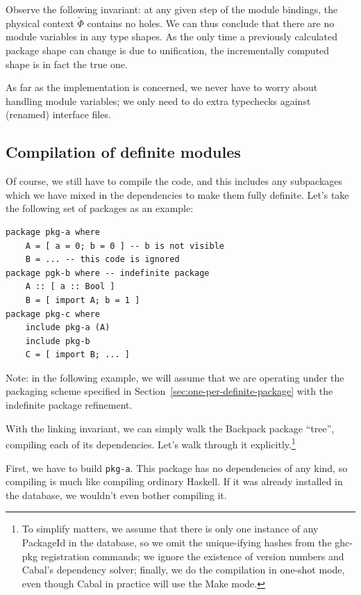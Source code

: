 \documentclass{article}
\begin{document}
Observe the following invariant: at any given step of the module
bindings, the physical context $\widetilde{\Phi}$ contains no
holes.  We can thus conclude that there are no module variables in any
type shapes.  As the only time a previously calculated package shape can
change is due to unification, the incrementally computed shape is in
fact the true one.

As far as the implementation is concerned, we never have to worry
about handling module variables; we only need to do extra typechecks
against (renamed) interface files.

\subsection{Compilation of definite modules}\label{sec:compiling-definite}

Of course, we still have to compile the code, and this includes any
subpackages which we have mixed in the dependencies to make them fully
definite.  Let's take the following set of packages as an example:

\begin{verbatim}
package pkg-a where
    A = [ a = 0; b = 0 ] -- b is not visible
    B = ... -- this code is ignored
package pgk-b where -- indefinite package
    A :: [ a :: Bool ]
    B = [ import A; b = 1 ]
package pkg-c where
    include pkg-a (A)
    include pkg-b
    C = [ import B; ... ]
\end{verbatim}

Note: in the following example, we will assume that we are operating
under the packaging scheme specified in Section~\ref{sec:one-per-definite-package}
with the indefinite package refinement.

With the linking invariant, we can simply walk the Backpack package ``tree'',
compiling each of its dependencies.  Let's walk through it explicitly.\footnote{To simplify matters, we assume that there is only one instance of any
PackageId in the database, so we omit the unique-ifying hashes from the
ghc-pkg registration commands; we ignore the existence of version numbers
and Cabal's dependency solver; finally, we do the compilation in
one-shot mode, even though Cabal in practice will use the Make mode.}

First, we have to build \verb|pkg-a|.  This package has no dependencies
of any kind, so compiling is much like compiling ordinary Haskell.  If
it was already installed in the database, we wouldn't even bother compiling it.
\end{document}
